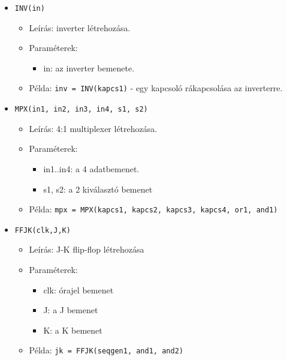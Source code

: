\begin{itemize}
\item \texttt{INV(in)}
	\begin{itemize}
	\item Leírás: inverter létrehozása.
	\item Paraméterek: 
		\begin{itemize}
			\item in: az inverter bemenete.
		\end{itemize}
	\item Példa: \texttt{inv = INV(kapcs1)} - egy kapcsoló rákapcsolása az inverterre.
	\end{itemize}
	
%	

\item \texttt{MPX(in1, in2, in3, in4, s1, s2)}
	\begin{itemize}
	\item Leírás: 4:1 multiplexer létrehozása.
	\item Paraméterek: 
		\begin{itemize}
			\item in1..in4: a 4 adatbemenet.
			\item s1, s2: a 2 kiválasztó bemenet
		\end{itemize}
	\item Példa: \texttt{mpx = MPX(kapcs1, kapcs2, kapcs3, kapcs4, or1, and1)}
	\end{itemize}	
	
\item \texttt{FFJK(clk,J,K)}
	\begin{itemize}
	\item Leírás: J-K flip-flop létrehozása
	\item Paraméterek: 
		\begin{itemize}
			\item clk: órajel bemenet
			\item J: a J bemenet
			\item K: a K bemenet
		\end{itemize}
	\item Példa: \texttt{jk = FFJK(seqgen1, and1, and2)}
	\end{itemize}


\end{itemize}
